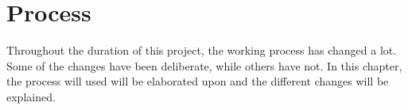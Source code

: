 \chapter{Process}
Throughout the duration of this project, the working process has changed a lot.
Some of the changes have been deliberate, while others have not.
In this chapter, the process will used will be elaborated upon and the different changes will be explained.
